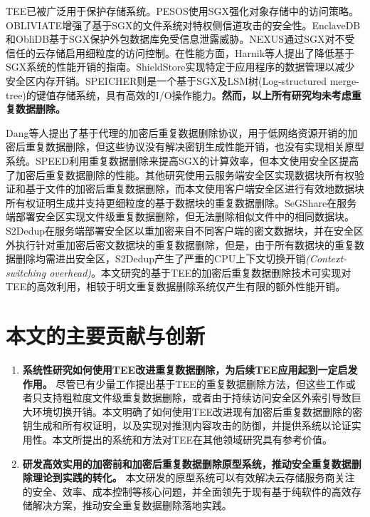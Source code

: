 TEE已被广泛用于保护存储系统。PESOS使用SGX强化对象存储中的访问策略。OBLIVIATE增强了基于SGX的文件系统对特权侧信道攻击的安全性。EnclaveDB和ObliDB基于SGX保护外包数据库免受信息泄露威胁。NEXUS通过SGX对不受信任的云存储启用细粒度的访问控制。在性能方面，Harnik等人提出了降低基于SGX系统的性能开销的指南。ShieldStore实现特定于应用程序的数据管理以减少安全区内存开销。SPEICHER则是一个基于SGX及LSM树(Log-structured merge-tree)的键值存储系统，具有高效的I/O操作能力。\textbf{然而，以上所有研究均未考虑重复数据删除。}

Dang等人提出了基于代理的加密后重复数据删除协议，用于低网络资源开销的加密后重复数据删除，但这些协议没有解决密钥生成性能开销，也没有实现相关原型系统。SPEED利用重复数据删除来提高SGX的计算效率，但本文使用安全区提高了加密后重复数据删除的性能。其他研究使用云服务端安全区实现数据块所有权验证和基于文件的加密后重复数据删除，而本文使用客户端安全区进行有效地数据块所有权证明生成并支持更细粒度的基于数据块的重复数据删除。SeGShare在服务端部署安全区实现文件级重复数据删除，但无法删除相似文件中的相同数据块。S2Dedup在服务端部署安全区以重加密来自不同客户端的密文数据块，并在安全区外执行针对重加密后密文数据块的重复数据删除，但是，由于所有数据块的重复数据删除均需进出安全区，S2Dedup产生了严重的CPU上下文切换开销\textit{(Context-switching overhead)}。本文研究的基于TEE的加密后重复数据删除技术可实现对TEE的高效利用，相较于明文重复数据删除系统仅产生有限的额外性能开销。

\section{本文的主要贡献与创新}

\begin{enumerate}[leftmargin=0em]
  \item \textbf{系统性研究如何使用TEE改进重复数据删除，为后续TEE应用起到一定启发作用。}
        尽管已有少量工作提出基于TEE的重复数据删除方法，但这些工作或者只支持粗粒度文件级重复数据删除，或者由于持续访问安全区外索引导致巨大环境切换开销。本文明确了如何使用TEE改进现有加密后重复数据删除的密钥生成和所有权证明，以及实现对推测内容攻击的防御，并提供系统以论证实用性。本文所提出的系统和方法对TEE在其他领域研究具有参考价值。
  \item \textbf{研发高效实用的加密前和加密后重复数据删除原型系统，推动安全重复数据删除理论到实践的转化。}
        本文研发的原型系统可以有效解决云存储服务商关注的安全、效率、成本控制等核心问题，并全面领先于现有基于纯软件的高效存储解决方案，推动安全重复数据删除落地实践。
\end{enumerate}

